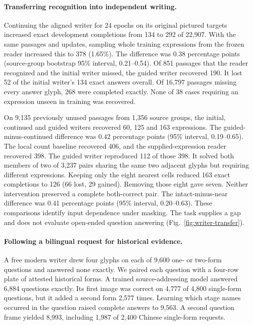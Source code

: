 \documentclass[12pt,a4paper]{article}
\providecommand{\DIFadd}[1]{{\protect\color{blue} \sf #1}} %
\begin{document}
\paragraph{\DIFadd{Transferring recognition into independent writing.}}
\DIFadd{Continuing the aligned writer for 24 epochs on its original pictured
targets increased exact development completions from 134 to 292 of
22,907. With the same passages and updates, sampling whole training
expressions from the frozen reader increased this to 378 (1.65\%).
The difference was 0.38 percentage points (source-group bootstrap
95\% interval, 0.21--0.54). Of 851 passages that the reader recognized
and the initial writer missed, the guided writer recovered 190. It
lost 52 of the initial writer's 134 exact answers overall. Of 16,797
passages missing every answer glyph, 268 were completed exactly. None of
38 cases requiring an expression unseen in training was recovered.
}

\DIFadd{On 9,135 previously unused passages from 1,356 source groups, the initial,
continued and guided writers recovered 60, 125 and 163 expressions.
The guided-minus-continued difference was 0.42 percentage points (95\%
interval, 0.19--0.65). The local count baseline recovered 406, and the
supplied-expression reader recovered 398. The guided writer reproduced
112 of those 398. It solved both members of two of 3,237 pairs sharing
the same two adjacent glyphs but requiring different expressions.
Keeping only the eight nearest cells reduced 163 exact completions to
126 (66 lost, 29 gained). Removing those eight gave seven. Neither
intervention preserved a complete both-correct pair. The intact-minus-near
difference was 0.41 percentage points (95\% interval, 0.20--0.63).
These comparisons identify input dependence under masking. The task
supplies a gap and does not evaluate open-ended question answering
(Fig.~\ref{fig:writer-transfer}).
}

\paragraph{\DIFadd{Following a bilingual request for historical evidence.}}
\DIFadd{A free modern writer drew four glyphs on each of 9,600 one- or two-form questions and answered none exactly. We paired each question with a four-row plate of attested historical forms. A trained source-addressing model answered 6,884 questions exactly. Its first image was correct on 4,777 of 4,800 single-form questions, but it added a second form 2,577 times. Learning which stage names occurred in the question raised complete answers to 9,563. A second question frame yielded 8,993, including 1,987 of 2,400 Chinese single-form requests.
}
\end{document}
